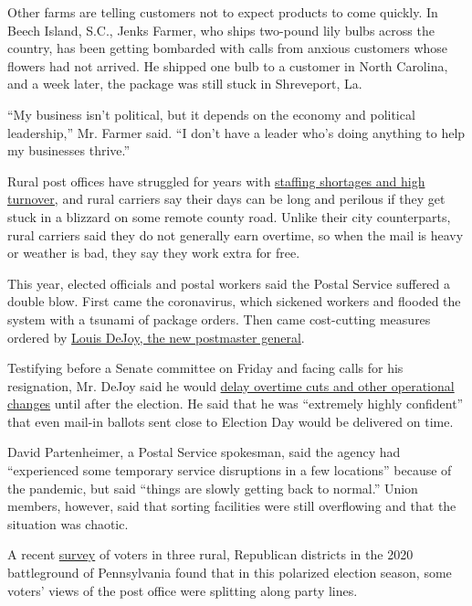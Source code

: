 Other farms are telling customers not to expect products to come
quickly. In Beech Island, S.C., Jenks Farmer, who ships two-pound lily
bulbs across the country, has been getting bombarded with calls from
anxious customers whose flowers had not arrived. He shipped one bulb to
a customer in North Carolina, and a week later, the package was still
stuck in Shreveport, La.

``My business isn't political, but it depends on the economy and
political leadership,'' Mr. Farmer said. ``I don't have a leader who's
doing anything to help my businesses thrive.''

Rural post offices have struggled for years with
\href{https://www.thenation.com/article/archive/in-rural-america-the-postal-service-is-already-collapsing/}{staffing
shortages and high turnover,} and rural carriers say their days can be
long and perilous if they get stuck in a blizzard on some remote county
road. Unlike their city counterparts, rural carriers said they do not
generally earn overtime, so when the mail is heavy or weather is bad,
they say they work extra for free.

This year, elected officials and postal workers said the Postal Service
suffered a double blow. First came the coronavirus, which sickened
workers and flooded the system with a tsunami of package orders. Then
came cost-cutting measures ordered by
\href{https://www.nytimes3xbfgragh.onion/article/general-louis-dejoy-postmaster.html}{Louis
DeJoy, the new postmaster general}.

Testifying before a Senate committee on Friday and facing calls for his
resignation, Mr. DeJoy said he would
\href{https://slack-redir.net/link?url=https\%3A\%2F\%2Fwww.nytimes3xbfgragh.onion\%2F2020\%2F08\%2F18\%2Fus\%2Fpolitics\%2Fpostal-service-suspends-changes.html}{delay
overtime cuts and other operational changes} until after the election.
He said that he was ``extremely highly confident'' that even mail-in
ballots sent close to Election Day would be delivered on time.

David Partenheimer, a Postal Service spokesman, said the agency had
``experienced some temporary service disruptions in a few locations''
because of the pandemic, but said ``things are slowly getting back to
normal.'' Union members, however, said that sorting facilities were
still overflowing and that the situation was chaotic.

A recent
\href{https://www.niskanencenter.org/niskanen-center-jmc-analytics-and-polling-survey-of-rural-voters-on-usps-covid19/}{survey}
of voters in three rural, Republican districts in the 2020 battleground
of Pennsylvania found that in this polarized election season, some
voters' views of the post office were splitting along party lines.

